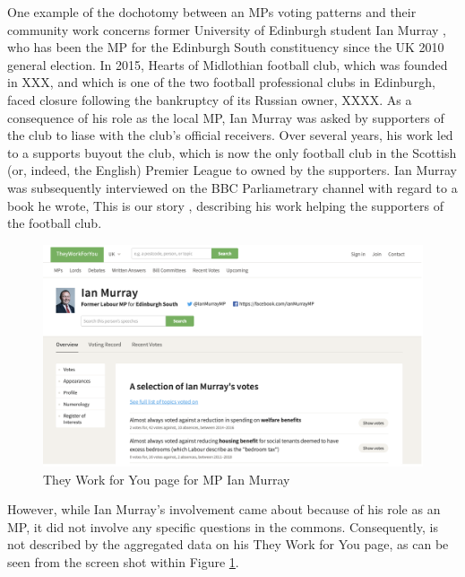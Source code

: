 One example of the dochotomy between an MPs voting patterns and their community work concerns former University of Edinburgh student Ian Murray \cite{ian-murray}, who has been the MP for the Edinburgh South constituency since the UK 2010 general election. 
In 2015, Hearts of Midlothian football club, which was founded in XXX, and which is one of the two football professional clubs in Edinburgh, faced closure following the bankruptcy of its Russian owner, XXXX.
As a consequence of his role as the local MP, Ian Murray was asked by supporters of the club to liase with the club's official receivers.
Over several years, his work led to a supports buyout the club, which is now the only football club in the Scottish (or, indeed, the English) Premier League to owned by the supporters.
Ian Murray was subsequently interviewed \cite{ian-murray-bbc} on the BBC Parliametrary channel \cite{bbc-parliament} with regard to a book he wrote, This is our story \cite{ian-murray-this-is-our-story}, describing his work helping the supporters of the football club.

\begin{figure}[h]
  \centering
  \includegraphics[scale=0.3]{images/they-work-for-you-ian-murray}
  \caption{They Work for You page for MP Ian Murray}
  \label{fig:they-work-for-you-ian-murray}
\end{figure}

However, while Ian Murray’s involvement came about because of his role as an MP, it did not involve any specific questions in the commons.
Consequently, is not described by the aggregated data on his They Work for You page, as can be seen from the screen shot within Figure \ref{fig:they-work-for-you-ian-murray}.